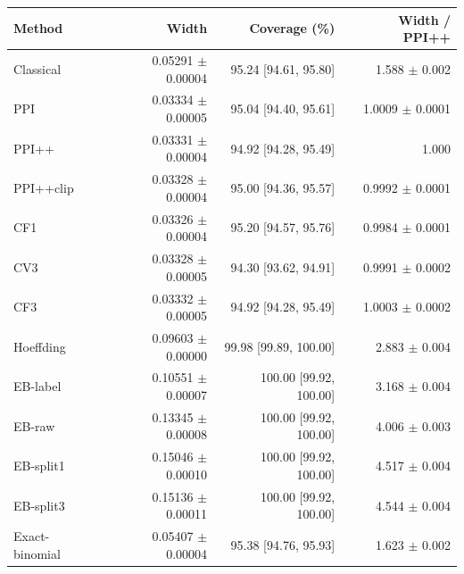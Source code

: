 \small
\begin{tabular}{lrrr}
\toprule
Method & Width & Coverage (\%) & Width / PPI++ \\
\midrule
Classical & 0.05291 $\pm$ 0.00004 & 95.24 [94.61, 95.80] & 1.588 $\pm$ 0.002 \\
PPI & 0.03334 $\pm$ 0.00005 & 95.04 [94.40, 95.61] & 1.0009 $\pm$ 0.0001 \\
PPI++ & 0.03331 $\pm$ 0.00004 & 94.92 [94.28, 95.49] & 1.000 \\
PPI++clip & 0.03328 $\pm$ 0.00004 & 95.00 [94.36, 95.57] & 0.9992 $\pm$ 0.0001 \\
CF1 & 0.03326 $\pm$ 0.00004 & 95.20 [94.57, 95.76] & 0.9984 $\pm$ 0.0001 \\
CV3 & 0.03328 $\pm$ 0.00005 & 94.30 [93.62, 94.91] & 0.9991 $\pm$ 0.0002 \\
CF3 & 0.03332 $\pm$ 0.00005 & 94.92 [94.28, 95.49] & 1.0003 $\pm$ 0.0002 \\
Hoeffding & 0.09603 $\pm$ 0.00000 & 99.98 [99.89, 100.00] & 2.883 $\pm$ 0.004 \\
EB-label & 0.10551 $\pm$ 0.00007 & 100.00 [99.92, 100.00] & 3.168 $\pm$ 0.004 \\
EB-raw & 0.13345 $\pm$ 0.00008 & 100.00 [99.92, 100.00] & 4.006 $\pm$ 0.003 \\
EB-split1 & 0.15046 $\pm$ 0.00010 & 100.00 [99.92, 100.00] & 4.517 $\pm$ 0.004 \\
EB-split3 & 0.15136 $\pm$ 0.00011 & 100.00 [99.92, 100.00] & 4.544 $\pm$ 0.004 \\
Exact-binomial & 0.05407 $\pm$ 0.00004 & 95.38 [94.76, 95.93] & 1.623 $\pm$ 0.002 \\
\bottomrule
\end{tabular}
